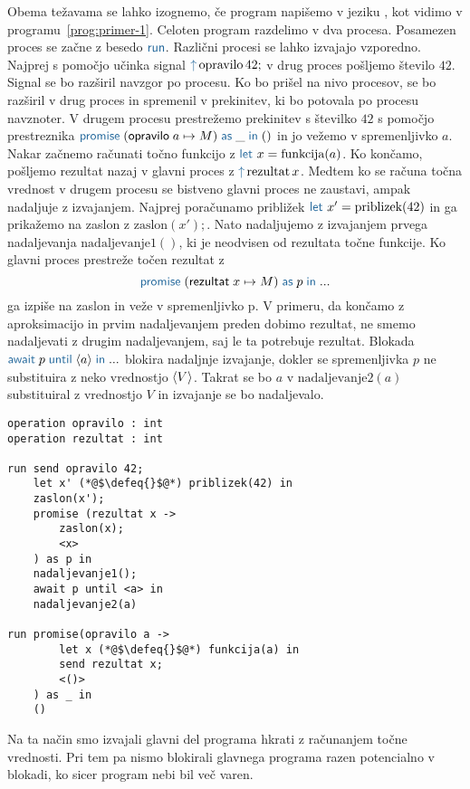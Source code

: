 Obema težavama se lahko izognemo, če program napišemo v jeziku \aeff, kot vidimo v programu~\ref{prog:primer-1}. Celoten program razdelimo v dva procesa. Posamezen proces se začne z besedo $\tmkw{run}$. Različni procesi se lahko izvajajo vzporedno.
Najprej s pomočjo učinka signal $\tmkw{\uparrow}\, \text{opravilo}\,42;$ v drug proces pošljemo število $42$. Signal se bo razširil navzgor po procesu. Ko bo prišel na nivo procesov, se bo razširil v drug proces in spremenil v prekinitev, ki bo potovala po procesu navznoter. V drugem procesu prestrežemo prekinitev s številko $42$ s pomočjo prestreznika $\tmwith{opravilo}{a}{M}{\_}{()}$ in jo vežemo v spremenljivko $a$. Nakar začnemo računati točno funkcijo z $\tmkw{let}\ x = \text{funkcija}(a)$. Ko končamo, pošljemo rezultat nazaj v glavni proces z $\tmkw{\uparrow}\, \text{rezultat}\,x$.
Medtem ko se računa točna vrednost v drugem procesu se bistveno glavni proces ne zaustavi, ampak nadaljuje z izvajanjem. Najprej poračunamo približek $\tmkw{let}\ x' = \text{priblizek}(42)$ in ga prikažemo na zaslon z $\text{zaslon}(x');$. Nato nadaljujemo z izvajanjem prvega nadaljevanja $\text{nadaljevanje}1()$, ki je neodvisen od rezultata točne funkcije. Ko glavni proces prestreže točen rezultat z $$\tmwith{rezultat}{x}{M}{p}{...}$$ ga izpiše na zaslon in veže v spremenljivko p. V primeru, da končamo z aproksimacijo in prvim nadaljevanjem preden dobimo rezultat, ne smemo nadaljevati z drugim nadaljevanjem, saj le ta potrebuje rezultat. Blokada $\tmawait{p}{a}{...}$ blokira nadaljnje izvajanje, dokler se spremenljivka $p$ ne substituira z neko vrednostjo $\langle V \rangle$. Takrat se bo $a$ v $\text{nadaljevanje}2(a)$ substituiral z vrednostjo $V$ in izvajanje se bo nadaljevalo.

\begin{lstlisting}[caption={Asinhron Vzporeden primer.},label={prog:primer-1},float,floatplacement=H]
operation opravilo : int
operation rezultat : int

run send opravilo 42;
    let x' (*@$\defeq{}$@*) priblizek(42) in
    zaslon(x');
    promise (rezultat x ->
    	zaslon(x);
    	<x>
    ) as p in
    nadaljevanje1();
    await p until <a> in
    nadaljevanje2(a)

run promise(opravilo a ->
    	let x (*@$\defeq{}$@*) funkcija(a) in
    	send rezultat x;
    	<()>
    ) as _ in
    ()
\end{lstlisting}

Na ta način smo izvajali glavni del programa hkrati z računanjem točne vrednosti. Pri tem pa nismo blokirali glavnega programa razen potencialno v blokadi, ko sicer program nebi bil več varen.